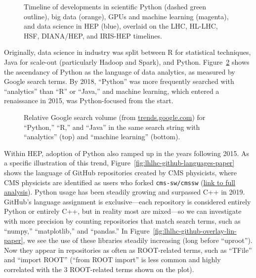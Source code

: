 \documentclass{article}
\begin{document}
\begin{figure}

\caption{Timeline of developments in scientific Python (dashed green outline), big data (orange), GPUs and machine learning (magenta), and data science in HEP (blue), overlaid on the LHC, HL-LHC, HSF, DIANA/HEP, and IRIS-HEP timelines. \label{fig:hllhc-python-timeline-paper}}
\end{figure}

Originally, data science in industry was split between R for statistical techniques, Java for scale-out (particularly Hadoop and Spark), and Python. Figure~\ref{fig:analytics-by-language} shows the ascendancy of Python as the language of data analytics, as measured by Google search terms. By 2018, ``Python'' was more frequently searched with ``analytics'' than ``R'' or ``Java,'' and machine learning, which entered a renaissance in 2015, was Python-focused from the start.

\begin{figure}

\caption{Relative Google search volume (from \href{https://trends.google.com/}{trends.google.com}) for ``Python,'' ``R,'' and ``Java'' in the same search string with ``analytics'' (top) and ``machine learning'' (bottom). \label{fig:analytics-by-language}}
\end{figure}

Within HEP, adoption of Python also ramped up in the years following 2015. As a specific illustration of this trend, Figure~\ref{fig:lhlhc-github-languages-paper} shows the language of GitHub repositories created by CMS physicists, where CMS physicists are identified as users who forked {\tt cms-sw/cmssw} (\href{https://github.com/jpivarski-talks/2021-02-24-reload-statistics}{link to full analysis}). Python usage has been steadily growing and surpassed C++ in 2019. GitHub's language assignment is exclusive---each repository is considered entirely Python or entirely C++, but in reality most are mixed---so we can investigate with more precision by counting repositories that match search terms, such as ``numpy,'' ``matplotlib,'' and ``pandas.'' In Figure~\ref{fig:lhlhc-github-overlay-lin-paper}, we see the use of these libraries steadily increasing (long before ``uproot''). Now they appear in repositories as often as ROOT-related terms, such as ``TFile'' and ``import ROOT'' (``from ROOT import'' is less common and highly correlated with the 3 ROOT-related terms shown on the plot).
\end{document}

